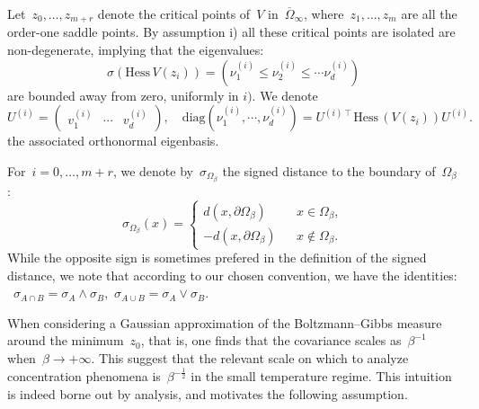 \documentclass[10pt]{article}
\newcommand{\Hess}{\mathrm{Hess}\,}
\newcommand{\1}{\mathbbm 1}
\newcommand{\hessPassage}[2][]{U^{(#2)#1}} %
\newcommand{\hessEigvec}[2]{v^{(#1)}_{#2}} %
\newcommand{\hessEigval}[2]{\nu^{(#1)}_{#2}} %
\begin{document}
    Let~$z_0,\dots,z_{m+r}$ denote the critical points of~$V$ in~$\overline{\Omega}_\infty$, where~$z_1,\dots,z_m$ are all the order-one saddle points. 
    By assumption i) all these critical points are isolated are non-degenerate, implying that the eigenvalues:
    \begin{equation}
        \label{eq:eigvals_hessian}
        \sigma(\Hess V(z_i)) = \left(\hessEigval{i}{1} \leq \hessEigval{i}{2} \leq \dotsm \hessEigval{i}{d}\right)
    \end{equation}
    are bounded away from zero, uniformly in $i)$. We denote
    \begin{equation}
        \label{eq:eigvecs_hessian}
        \hessPassage{i} =\begin{pmatrix}\hessEigvec{i}{1}&\dotsm&\hessEigvec{i}{d}\end{pmatrix},\quad \mathrm{diag}(\hessEigval{i}{1},\dotsm,\hessEigval{i}{d}) = \hessPassage[\intercal]{i} \Hess(V(z_i)) \hessPassage{i}.
    \end{equation}
    the associated orthonormal eigenbasis.

    For~$i=0,\dots,m+r$, we denote by~$\sigma_{\Omega_\beta}$ the signed distance to the boundary of~$\Omega_\beta$:
    \begin{equation}
        \sigma_{\Omega_\beta}(x) = \left\{\begin{aligned}
            d(x,\partial\Omega_\beta)&&x\in\Omega_\beta,\\
            -d(x,\partial\Omega_\beta)&&x\not\in\Omega_\beta.
        \end{aligned}\right.
    \end{equation}
    While the opposite sign is sometimes prefered in the definition of the signed distance, we note that according to our chosen convention, we have the identities: ~$\sigma_{A\cap B} = \sigma_A \land \sigma_B$,~$\sigma_{A\cup B}=\sigma_A \lor \sigma_B$.

    When considering a Gaussian approximation of the Boltzmann--Gibbs measure around the minimum~$z_0$, that is, one finds that the covariance scales as~$\beta^{-1}$ when~$\beta\to+\infty$. This suggest that the relevant scale on which to analyze concentration phenomena is~$\beta^{-\frac 12}$ in the small temperature regime.
    This intuition is indeed borne out by analysis, and motivates the following assumption.
\end{document}
